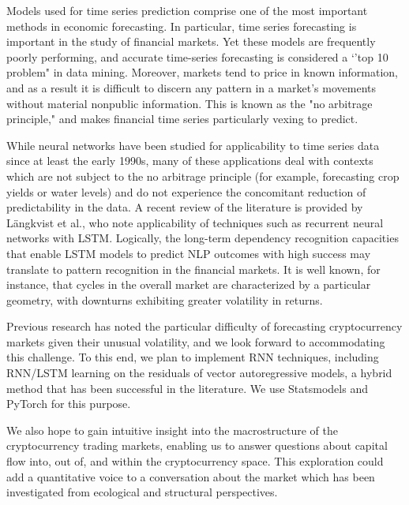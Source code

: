 
Models used for time series prediction comprise one of the most important methods in economic forecasting. In particular, time series forecasting is important in the study of financial markets. Yet these models are frequently poorly performing, and accurate time-series forecasting is considered a `'top 10 problem" in data mining. \cite{YW} Moreover, markets tend to price in known information, and as a result it is difficult to discern any pattern in a market's movements without material nonpublic information. \cite{r} This is known as the "no arbitrage principle," and makes financial time series particularly vexing to predict.

While neural networks have been studied for applicability to time series data since at least the early 1990s, \cite{Azoff} many of these applications deal with contexts which are not subject to the no arbitrage principle (for example, forecasting crop yields or water levels) and do not experience the concomitant reduction of predictability in the data. A recent review of the literature is provided by Längkvist et al., who note applicability of techniques such as recurrent neural networks with LSTM. \cite{Lankvist} Logically, the long-term dependency recognition capacities that enable LSTM models to predict NLP outcomes with high success may translate to pattern recognition in the financial markets. It is well known, for instance, that cycles in the overall market are characterized by a particular geometry, with downturns exhibiting greater volatility in returns.

Previous research has noted the particular difficulty of forecasting cryptocurrency markets given their unusual volatility, and we look forward to accommodating this challenge. \cite{ian} To this end, we plan to implement RNN techniques, including RNN/LSTM learning on the residuals of vector autoregressive models, a hybrid method that has been successful in the literature. \cite{r2n2} We use Statsmodels and PyTorch for this purpose. 

We also hope to gain intuitive insight into the macrostructure of the cryptocurrency trading markets, enabling us to answer questions about capital flow into, out of, and within the cryptocurrency space. This exploration could add a quantitative voice to a conversation about the market which has been investigated from ecological \cite{ecology} and structural \cite{structure} perspectives. 